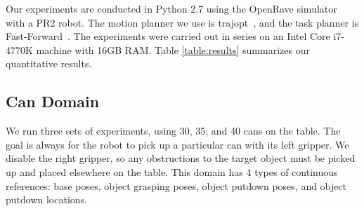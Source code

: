 Our experiments are conducted in Python 2.7 using the OpenRave simulator~\cite{Diankov_2008_6117} with a PR2 robot.
The motion planner we use is trajopt~\cite{schulman2013finding}, and the task planner is Fast-Forward~\cite{FF}.
The experiments were carried out in series on an Intel Core i7-4770K machine with 16GB RAM.
Table \ref{table:results} summarizes our quantitative results.


\subsection{Can Domain}
We run three sets of experiments, using 30, 35, and 40 cans on the table.
The goal is always for the robot to pick up a particular can with its
left gripper. We disable the right gripper, so any obstructions to the target object must be picked up and
placed elsewhere on the table. This domain has 4 types of continuous references: base poses, object grasping
poses, object putdown poses, and object putdown locations.

